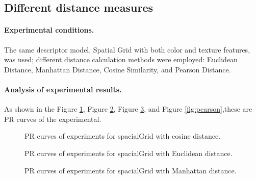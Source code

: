 \documentclass{article}
\begin{document}
\subsection{Different distance measures}

\paragraph{Experimental conditions.}
The same descriptor model, Spatial Grid with both color and texture features, was used; different distance calculation methods were employed: Euclidean Distance, Manhattan Distance, Cosine Similarity, and Pearson Distance.

\paragraph{Analysis of experimental results.}


As shown in the Figure \ref{fig:cosine}, Figure \ref{fig:euclidean},  Figure \ref{fig:manhattan}, and Figure \ref{fig:pearson},these are PR curves of the experimental.

\begin{figure}[!tbp]
  \centering
  \hfill
  \hfill
  \caption{\label{fig:cosine} PR curves of experiments for spacialGrid with cosine distance.}
\end{figure}

\begin{figure}[!tbp]
  \centering
  \hfill
  \hfill
  \caption{\label{fig:euclidean} PR curves of experiments for spacialGrid with Euclidean distance.}
\end{figure}

\begin{figure}[!tbp]
  \centering
  \hfill
  \hfill
  \caption{\label{fig:manhattan} PR curves of experiments for spacialGrid with Manhattan distance.}
\end{figure}
\end{document}
